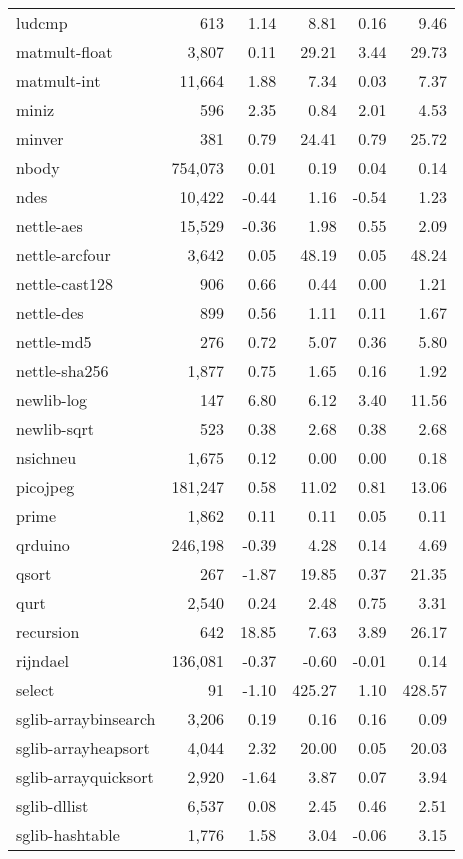 \begin{table}[ptb]
{\begin{tabular}{@{}lrrrrr@{}}
ludcmp & 613 & 1.14 & 8.81 & 0.16 & 9.46 \\
matmult-float & 3,807 & 0.11 & 29.21 & 3.44 & 29.73 \\
matmult-int & 11,664 & 1.88 & 7.34 & 0.03 & 7.37 \\
miniz & 596 & 2.35 & 0.84 & 2.01 & 4.53 \\
minver & 381 & 0.79 & 24.41 & 0.79 & 25.72 \\
nbody & 754,073 & 0.01 & 0.19 & 0.04 & 0.14 \\
ndes & 10,422 & -0.44 & 1.16 & -0.54 & 1.23 \\
nettle-aes & 15,529 & -0.36 & 1.98 & 0.55 & 2.09 \\
nettle-arcfour & 3,642 & 0.05 & 48.19 & 0.05 & 48.24 \\
nettle-cast128 & 906 & 0.66 & 0.44 & 0.00 & 1.21 \\
nettle-des & 899 & 0.56 & 1.11 & 0.11 & 1.67 \\
nettle-md5 & 276 & 0.72 & 5.07 & 0.36 & 5.80 \\
nettle-sha256 & 1,877 & 0.75 & 1.65 & 0.16 & 1.92 \\
newlib-log & 147 & 6.80 & 6.12 & 3.40 & 11.56 \\
newlib-sqrt & 523 & 0.38 & 2.68 & 0.38 & 2.68 \\
nsichneu & 1,675 & 0.12 & 0.00 & 0.00 & 0.18 \\
picojpeg & 181,247 & 0.58 & 11.02 & 0.81 & 13.06 \\
prime & 1,862 & 0.11 & 0.11 & 0.05 & 0.11 \\
qrduino & 246,198 & -0.39 & 4.28 & 0.14 & 4.69 \\
qsort & 267 & -1.87 & 19.85 & 0.37 & 21.35 \\
qurt & 2,540 & 0.24 & 2.48 & 0.75 & 3.31 \\
recursion & 642 & 18.85 & 7.63 & 3.89 & 26.17 \\
rijndael & 136,081 & -0.37 & -0.60 & -0.01 & 0.14 \\
select & 91 & -1.10 & 425.27 & 1.10 & 428.57 \\
sglib-arraybinsearch & 3,206 & 0.19 & 0.16 & 0.16 & 0.09 \\
sglib-arrayheapsort & 4,044 & 2.32 & 20.00 & 0.05 & 20.03 \\
sglib-arrayquicksort & 2,920 & -1.64 & 3.87 & 0.07 & 3.94 \\
sglib-dllist & 6,537 & 0.08 & 2.45 & 0.46 & 2.51 \\
sglib-hashtable & 1,776 & 1.58 & 3.04 & -0.06 & 3.15 \\

\end{tabular}}
\end{table}
